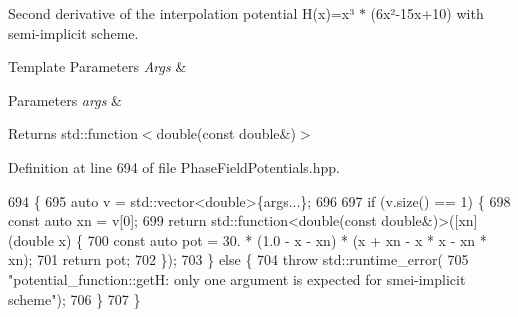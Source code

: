 Second derivative of the interpolation potential H(x)=x³ $\ast$ (6x²-\/15x+10) with semi-\/implicit scheme. 


\begin{DoxyTemplParams}{Template Parameters}
{\em Args} & \\
\hline
\end{DoxyTemplParams}

\begin{DoxyParams}{Parameters}
{\em args} & \\
\hline
\end{DoxyParams}
\begin{DoxyReturn}{Returns}
std\+::function$<$double(const double\&)$>$ 
\end{DoxyReturn}


Definition at line 694 of file Phase\+Field\+Potentials.\+hpp.


\begin{DoxyCode}
694                                                         \{
695     \textcolor{keyword}{auto} v = std::vector<double>\{args...\};
696 
697     \textcolor{keywordflow}{if} (v.size() == 1) \{
698       \textcolor{keyword}{const} \textcolor{keyword}{auto} xn = v[0];
699       \textcolor{keywordflow}{return} std::function<double(const double&)>([xn](\textcolor{keywordtype}{double} x) \{
700         \textcolor{keyword}{const} \textcolor{keyword}{auto} pot = 30. * (1.0 - x - xn) * (x + xn - x * x - xn * xn);
701         \textcolor{keywordflow}{return} pot;
702       \});
703     \} \textcolor{keywordflow}{else} \{
704       \textcolor{keywordflow}{throw} std::runtime\_error(
705           \textcolor{stringliteral}{"potential\_function::getH: only one argument is expected for smei-implicit scheme"});
706     \}
707   \}
\end{DoxyCode}
\mbox{\label{structpotential__function_3_012_00_01ThermodynamicsPotentialDiscretization_1_1SemiImplicit_01_4_a80077a6db9f6c510c4c348e8d17b66af}} 
